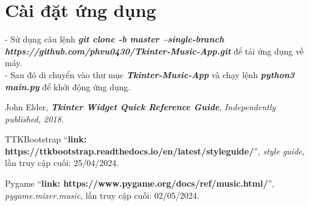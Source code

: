 \documentclass[a4paper]{article}
\begin{document}
\section{Cài đặt ứng dụng}
- Sử dụng câu lệnh \textbf{\textit{git clone -b master --single-branch https://github.com/phvu0430/Tkinter-Music-App.git}} để tải ứng dụng về máy. \\
- Sau đó di chuyển vào thư mục \textbf{\textit{Tkinter-Music-App}} và chạy lệnh \textbf{\textit{python3 main.py}} để khởi động ứng dụng.
\newpage


\newpage
\begin{thebibliography}{80}

John Elder, 
\textbf{\textit{Tkinter Widget Quick Reference Guide}},
\textit{Independently published, 2018}.

TTKBootstrap
``\textbf{link: https://ttkbootstrap.readthedocs.io/en/latest/styleguide/}'',
\textit{style guide}, lần truy cập cuối: 25/04/2024.

Pygame
``\textbf{link: https://www.pygame.org/docs/ref/music.html/}'',
\textit{pygame.mixer.music}, lần truy cập cuối: 02/05/2024.



\end{thebibliography}
\end{document}
